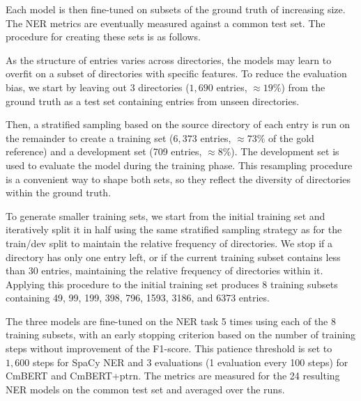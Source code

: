 Each model is then fine-tuned on subsets of the ground truth of increasing size.
The NER metrics are eventually measured against a common test set.
The procedure for creating these sets is as follows. 

As the structure of entries varies across directories, the models may learn to overfit on a subset of directories with specific features. 
To reduce the evaluation bias, we start by leaving out 3 directories ($1,690$ entries, $\approx 19\%$) from the ground truth as a test set containing entries from unseen directories.

Then, a stratified sampling based on the source directory of each entry is run on the remainder to create a training set ($6,373$ entries, $\approx 73\%$ of the gold reference) and a development set (709 entries, $\approx 8\%$).
The development set is used to evaluate the model during the training phase.
This resampling procedure is a convenient way to shape both sets, so they reflect the diversity of directories within the ground truth.

To generate smaller training sets, we start from the initial training set and iteratively split it in half using the same stratified sampling strategy as for the train/dev split to maintain the relative frequency of directories. 
We stop if a directory has only one entry left, or if the current training subset contains less than 30 entries, maintaining the relative frequency of directories within it.
Applying this procedure to the initial training set produces 8 training subsets containing 49, 99, 199, 398, 796, 1593, 3186, and 6373 entries.

The three models are fine-tuned on the NER task 5 times using each of the 8 training subsets, with an early stopping criterion based on the number of training steps without improvement of the F1-score. 
This patience threshold is set to $1,600$ steps for SpaCy NER and 3 evaluations (1 evaluation every 100 steps) for CmBERT and CmBERT+ptrn.
The metrics are measured for the 24 resulting NER models on the common test set and averaged over the runs.





